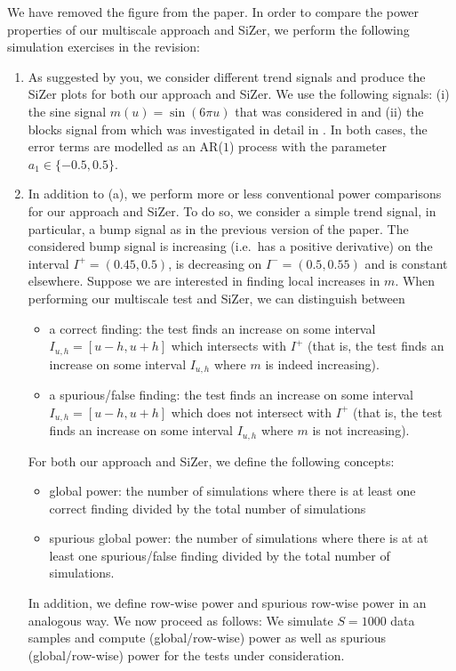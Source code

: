 \documentclass[a4paper,12pt]{article}
\begin{document}
\begin{enumerate}[label=(\arabic*),leftmargin=0.7cm]
We have removed the figure from the paper. In order to compare the power properties of our multiscale approach and SiZer, we perform the following simulation exercises in the revision:
\begin{enumerate}[label=(\alph*), leftmargin=0.7cm]

\item As suggested by you, we consider different trend signals and produce the SiZer plots for both our approach and SiZer. We use the following signals: (i) the sine signal $m(u) = \sin(6\pi u)$ that was considered in \cite{ParkHannigKang2009} and (ii) the blocks signal from \cite{DonohoJohnstone1995} which was investigated in detail in \cite{HannigMarron2006}. In both cases, the error terms are modelled as an AR($1$) process with the parameter $a_1 \in\{-0.5,0.5\}$. 

\item In addition to (a), we perform more or less conventional power comparisons for our approach and SiZer. To do so, we consider a simple trend signal, in particular, a bump signal as in the previous version of the paper. The considered bump signal is increasing (i.e.\ has a positive derivative) on the interval $I^+ = (0.45,0.5)$, is decreasing on $I^- = (0.5,0.55)$ and is constant elsewhere. Suppose we are interested in finding local increases in $m$. When performing our multiscale test and SiZer, we can distinguish between 
\begin{itemize}[leftmargin=0.5cm,itemsep=0cm]
\item a correct finding: the test finds an increase on some interval $I_{u,h} = [u-h,u+h]$ which intersects with $I^+$ (that is, the test finds an increase on some interval $I_{u,h}$ where $m$ is indeed increasing).
\item a spurious/false finding: the test finds an increase on some interval $I_{u,h} = [u-h,u+h]$ which does not intersect with $I^+$ (that is, the test finds an increase on some interval $I_{u,h}$ where $m$ is not increasing).
\end{itemize}
For both our approach and SiZer, we define the following concepts: 
\begin{itemize}[leftmargin=0.5cm,itemsep=0cm]
\item global power: the number of simulations where there is at least one correct finding divided by the total number of simulations
\item spurious global power: the number of simulations where there is at at least one spurious/false finding divided by the total number of simulations.
\end{itemize}
In addition, we define row-wise power and spurious row-wise power in an ana\-logous way. We now proceed as follows: We simulate $S=1000$ data samples and compute (global/row-wise) power as well as spurious (global/row-wise) power for the tests under consideration.  


\end{enumerate}
\end{enumerate}
\end{document}
